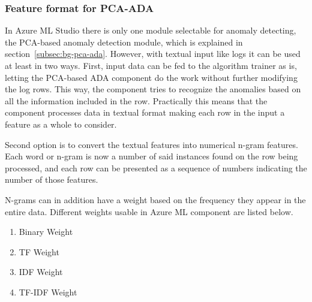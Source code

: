 

\subsubsection*{Feature format for PCA-ADA}
In Azure ML Studio
there is only one module selectable
for anomaly detecting,
the PCA-based anomaly detection module,
which is explained in section~\ref{subsec:bg-pca-ada}.
However,
with textual input like logs
it can be used at least in two ways.
First,
input data can be fed to
the algorithm trainer as is,
letting the PCA-based ADA component %
do the work without further modifying the log rows.
This way,
the component tries to recognize the anomalies
based on all the information included in the row.
Practically this means
that the component processes data in textual format
making each row in the input
a feature as a whole
to consider.

Second option is to
convert the textual features
into numerical n-gram features.
Each word or n-gram
is now a number of said instances found on
the row being processed,
and each row can be presented
as a sequence of numbers
indicating the number of those features.

N-grams can in addition have a weight
based on the frequency they appear
in the entire data.
Different weights usable in Azure ML component
are listed below.

\begin{enumerate}
    \item Binary Weight
    \item TF Weight
    \item IDF Weight
    \item TF-IDF Weight
\end{enumerate}


%


